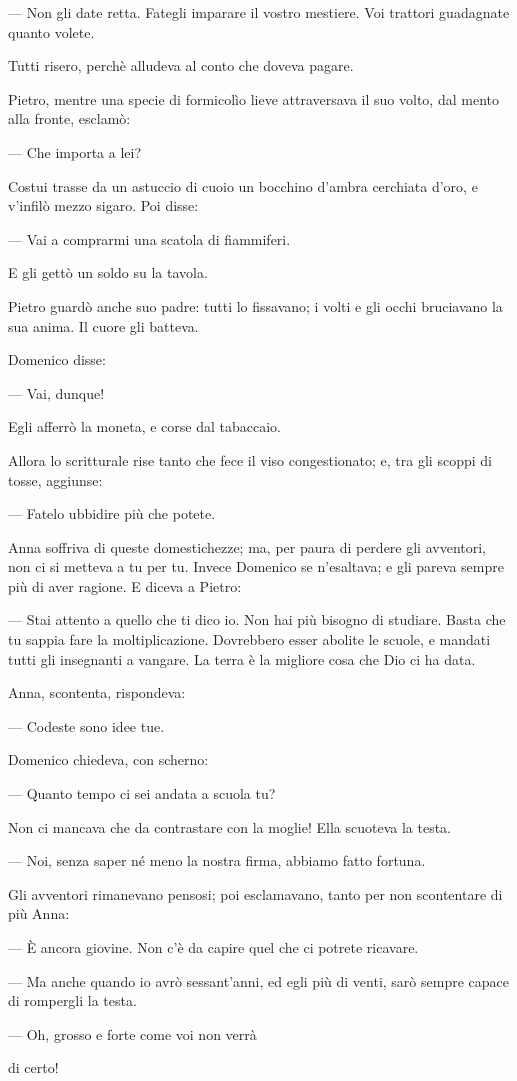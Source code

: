— Non gli date retta. Fategli imparare il vostro mestiere. Voi trattori guadagnate quanto volete.

Tutti risero, perchè alludeva al conto che doveva pagare.

Pietro, mentre una specie di formicolìo lieve attraversava il suo volto, dal mento alla fronte, esclamò:

— Che importa a lei?

Costui trasse da un astuccio di cuoio un bocchino d'ambra cerchiata d'oro, e v'infilò mezzo sigaro. Poi disse:

— Vai a comprarmi una scatola di fiammiferi.

E gli gettò un soldo su la tavola.

Pietro guardò anche suo padre: tutti lo fissavano; i volti e gli occhi bruciavano la sua anima. Il cuore gli batteva.

Domenico disse:

— Vai, dunque!

Egli afferrò la moneta, e corse dal tabaccaio.

Allora lo scritturale rise tanto che fece il viso congestionato; e, tra gli scoppi di tosse, aggiunse:

— Fatelo ubbidire più che potete.

Anna soffriva di queste domestichezze; ma, per paura di perdere gli avventori, non ci si metteva a tu per tu. Invece Domenico se n'esaltava; e gli pareva sempre più di aver ragione. E diceva a Pietro:

— Stai attento a quello che ti dico io. Non hai più bisogno di studiare. Basta che tu sappia fare la moltiplicazione. Dovrebbero esser abolite le scuole, e mandati tutti gli insegnanti a vangare. La terra è la migliore cosa che Dio ci ha data.

Anna, scontenta, rispondeva:

— Codeste sono idee tue.

Domenico chiedeva, con scherno:

— Quanto tempo ci sei andata a scuola tu?

Non ci mancava che da contrastare con la moglie! Ella scuoteva la testa.

— Noi, senza saper né meno la nostra firma, abbiamo fatto fortuna.

Gli avventori rimanevano pensosi; poi esclamavano, tanto per non scontentare di più Anna:

— È ancora giovine. Non c'è da capire quel che ci potrete ricavare.

— Ma anche quando io avrò sessant'anni, ed egli più di venti, sarò sempre capace di rompergli la testa.

— Oh, grosso e forte come voi non verrà

di certo!
